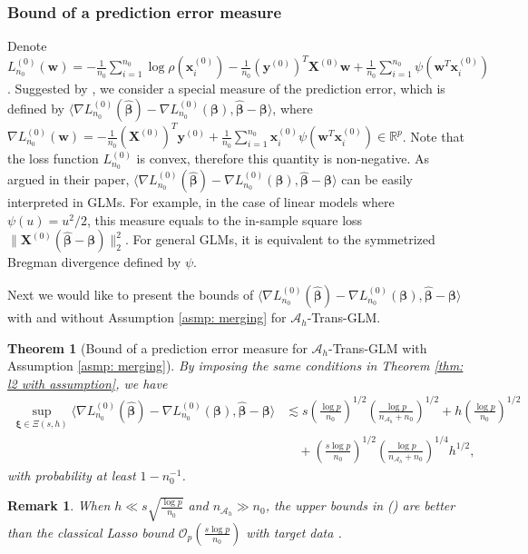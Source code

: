 \documentclass[12pt]{article}
\newcommand*{\rom}[1]{\romannumeral #1}
\newcommand{\bxi}{\bm{\xi}}
\newcommand{\twonorm}[1]{\|#1\|_{2}}
\newcommand{\bbeta}{\bm{\beta}}
\newcommand{\hbeta}{\hat{\bm{\beta}}}
\newcommand{\bx}{\bm{x}}
\newcommand{\bxk}[1]{\bm{x}^{(#1)}}
\newcommand{\bw}{\bm{w}}
\newcommand{\mah}{\mathcal{A}_h}
\newcommand{\nah}{n_{\mathcal{A}_h}}
\newcommand{\by}{\bm{y}}
\newcommand{\bX}{\bm{X}}
\newcommand{\<}{\langle}
\renewcommand{\>}{\rangle}
\newtheorem{theorem}{Theorem}
\newtheorem{remark}{Remark}
\begin{document}
\subsubsection{Bound of a prediction error measure}
Denote $L^{(0)}_{n_0}(\bw) = -\frac{1}{n_0}\sum_{i=1}^{n_0}\log \rho(\bxk{0}_i)-\frac{1}{n_0}(\by^{(0)})^T\bX^{(0)}\bw + \frac{1}{n_0}\sum\limits_{i=1}^{n_0}\psi(\bw^T\bx^{(0)}_i)$. Suggested by \cite{loh2015regularized}, we consider a special measure of the prediction error, which is defined by $\<\nabla L^{(0)}_{n_0}(\hbeta) -\nabla L^{(0)}_{n_0}(\bbeta), \hbeta - \bbeta\>$, where $\nabla L^{(0)}_{n_0}(\bw) = -\frac{1}{n_0}(\bX^{(0)})^T\by^{(0)} + \frac{1}{n_0}\sum\limits_{i=1}^{n_0}\bx^{(0)}_i\psi(\bw^T\bx^{(0)}_i) \in \mathbb{R}^p$. Note that the loss function $L^{(0)}_{n_0}$ is convex, therefore this quantity is non-negative. As argued in their paper, $\<\nabla L^{(0)}_{n_0}(\hbeta) -\nabla L^{(0)}_{n_0}(\bbeta), \hbeta - \bbeta\>$ can be easily interpreted in GLMs. For example, in the case of linear models where $\psi(u) = u^2/2$, this measure equals to the in-sample square loss $\twonorm{\bX^{(0)}(\hbeta - \bbeta)}^2$. For general GLMs, it is equivalent to the symmetrized Bregman divergence defined by $\psi$. 

Next we would like to present the bounds of $\<\nabla L^{(0)}_{n_0}(\hbeta) -\nabla L^{(0)}_{n_0}(\bbeta), \hbeta - \bbeta\>$ with and without Assumption \ref{asmp: merging} for $\mah$-Trans-GLM.

\begin{theorem}[Bound of a prediction error measure for $\mah$-Trans-GLM with Assumption \ref{asmp: merging}]\label{thm: prediction error with assumption}
	By imposing the same conditions in Theorem \ref{thm: l2 with assumption}, we have		
	\begin{align}
			\sup_{\bxi \in \Xi(s, h)}\<\nabla L^{(0)}_{n_0}(\hbeta) -\nabla L^{(0)}_{n_0}(\bbeta), \hbeta - \bbeta\> 
			&\lesssim s\left(\frac{\log p}{n_0}\right)^{1/2}\left(\frac{\log p}{\nah+n_0}\right)^{1/2} + h\left(\frac{\log p}{n_0}\right)^{1/2} \\
			&\quad + \left(\frac{s\log p}{n_0}\right)^{1/2}\left(\frac{\log p}{\nah+n_0}\right)^{1/4}h^{1/2}, \label{eq: prediction error bound 1 with asmp}
	\end{align}
		with probability at least $1-n_0^{-1}$.
\end{theorem}

\begin{remark}
	When $h \ll s\sqrt{\frac{\log p}{n_0}}$ and $\nah \gg n_0$, the upper bounds in (\rom{1})  are better than the classical Lasso bound $\mathcal{O}_p\left(\frac{s\log p}{n_0}\right)$ with target data \citep{loh2015regularized}. 
\end{remark}
\end{document}
